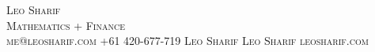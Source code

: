 \documentclass[12pt]{article}
\begin{document}
\begin{center}
    \huge\scshape Leo Sharif \\
    \vspace{0.5em}
    \normalsize Mathematics + Finance \\
    \vspace{0.5em}
    \faEnvelope \hspace{0.1em} me@leosharif.com \quad
    \faPhone \hspace{0.1em} +61 420-677-719 \quad
    \faLinkedin \hspace{0.1em} Leo Sharif \quad
    \faGithub \hspace{0.1em} Leo Sharif \quad
    \faGlobe \hspace{0.1em} leosharif.com
\end{center}
\end{document}
